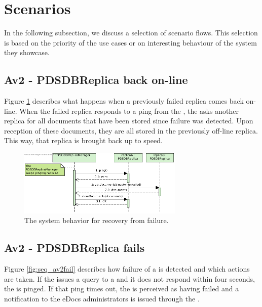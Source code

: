 \section{Scenarios}\label{sec:scenarios}
In the following subsection, we discuss a selection of scenario flows. This selection is based on the priority of the use cases or on interesting behaviour of the system they showcase.

\subsection{Av2 - PDSDBReplica back on-line}
Figure \ref{fig:seq_av2online} describes what happens when a previously failed replica comes back on-line. When the failed replica responds to a ping from the , the  asks another replica for all documents that have been stored since failure was detected. Upon reception of these documents, they are all stored in the previously off-line replica. This way, that replica is brought back up to speed.

\begin{figure}[!htp]
    \centering
    \includegraphics[width=0.7\textwidth]{figures/Av2 - PDSDBReplica back on-line.png}
    \caption{The system behavior for recovery from  failure.
        }\label{fig:seq_av2online}
\end{figure}

\subsection{Av2 - PDSDBReplica fails}
Figure \ref{fig:seq_av2fail} describes how failure of a  is detected and which actions are taken. If the  issues a query to a  and it does not respond within four seconds, the  is pinged. If that ping times out, the  is perceived as having failed and a notification to the eDocs administrators is issued through the .

